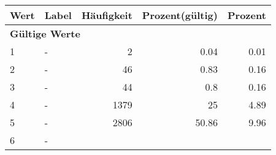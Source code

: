      \begin{longtable}{lXrrr}
     \toprule
     \textbf{Wert} & \textbf{Label} & \textbf{Häufigkeit} & \textbf{Prozent(gültig)} & \textbf{Prozent} \\
     \endhead
     \midrule
     \multicolumn{5}{l}{\textbf{Gültige Werte}}\\

     1 &
     \multicolumn{1}{X}{ -  } &


       \num{2} &
       \num[round-mode=places,round-precision=2]{0.04} &
         \num[round-mode=places,round-precision=2]{0.01} \\

     2 &
     \multicolumn{1}{X}{ -  } &


       \num{46} &
       \num[round-mode=places,round-precision=2]{0.83} &
         \num[round-mode=places,round-precision=2]{0.16} \\

     3 &
     \multicolumn{1}{X}{ -  } &


       \num{44} &
       \num[round-mode=places,round-precision=2]{0.8} &
         \num[round-mode=places,round-precision=2]{0.16} \\

     4 &
     \multicolumn{1}{X}{ -  } &


       \num{1379} &
       \num[round-mode=places,round-precision=2]{25} &
         \num[round-mode=places,round-precision=2]{4.89} \\

     5 &
     \multicolumn{1}{X}{ -  } &


       \num{2806} &
       \num[round-mode=places,round-precision=2]{50.86} &
         \num[round-mode=places,round-precision=2]{9.96} \\

     6 &
     \multicolumn{1}{X}{ -  } &



\end{longtable}
